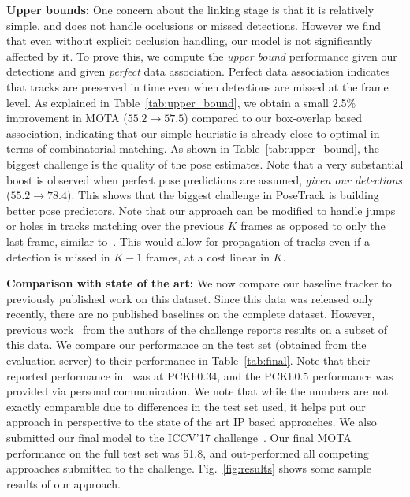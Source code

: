 \documentclass[10pt,twocolumn,letterpaper]{article}
\begin{document}
{\noindent \bf Upper bounds:}\label{sec:expts:upperbounds}
One concern about the linking stage is that it is relatively simple, and does not handle occlusions or missed detections.
However we find that even without explicit occlusion handling, our model is not significantly affected by it.
To prove this, we compute the {\em upper bound} performance given our detections and given {\em perfect} data association. Perfect data association indicates that tracks are preserved in time even when detections are missed at the frame level. As explained in Table~\ref{tab:upper_bound}, we obtain a small 2.5\% improvement in MOTA ($55.2 \rightarrow 57.5$) compared to our box-overlap based association, indicating that our simple heuristic is already close to optimal in terms of combinatorial matching. As shown in Table~\ref{tab:upper_bound}, the biggest challenge is the quality of the pose estimates. Note that a very substantial boost is observed when perfect pose predictions are assumed, {\em given our detections} ($55.2 \rightarrow 78.4$). This shows that the biggest challenge in PoseTrack is building better pose predictors.
Note that
our approach can be modified to handle jumps or holes in tracks
matching over the previous $K$ frames as opposed to only the last frame, similar to~\cite{pirsiavash2011globally}. This would allow for propagation of tracks even if a detection is missed in $K-1$ frames, at a cost linear in $K$.



{\noindent \bf Comparison with state of the art:}
We now compare our baseline tracker to previously published work on this dataset. Since this data was released only recently,
there are no published baselines on the complete dataset. However, previous work~\cite{iqbal2016pose} from the authors of the challenge reports results on a subset of this data. We compare our performance on the test set (obtained from the evaluation server) to their performance in Table~\ref{tab:final}.
Note that their reported performance in~\cite{iqbal2016pose} was at PCKh0.34, and the PCKh0.5 performance was provided via personal
communication.
We note that while the numbers are not exactly comparable due to differences in the test set used, it helps put our approach in
perspective to the state of the art IP based approaches.
We also submitted our final model to the ICCV'17 challenge~\cite{posetrack_challenge}.
Our final MOTA performance on the full test set was 51.8, and 
out-performed all competing approaches submitted to the challenge. Fig.~\ref{fig:results} shows some sample results of our approach.
\end{document}
